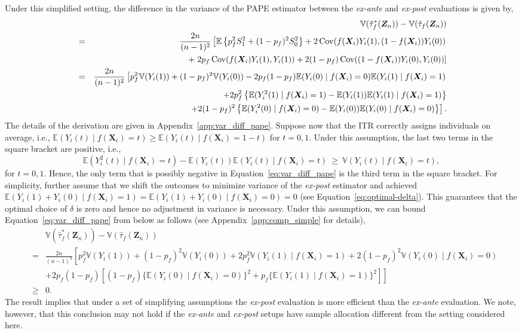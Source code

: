 \documentclass[USenglish,onecolumn]{article}
\DeclareMathOperator\Cov{Cov}
\renewcommand\r{\right}
\renewcommand\l{\left}
\newcommand\E{\mathbb{E}}
\newcommand\V{\mathbb{V}}
\newcommand\bX{\bm{X}}
\newcommand\bZ{\bm{Z}}
\begin{document}
Under this simplified setting, the difference in the variance of the
PAPE estimator between the \textit{ex-ante} and \textit{ex-post}
evaluations is given by,
\begin{eqnarray}
	& & \V(\hat{\tau}_f^\ast(\bZ_n))-\V(\hat{\tau}_f(\bZ_n)) \nonumber\\
	& = & \frac{2n}{(n-1)^2}\l[\E\l\{p_f^2S_1^2+(1-p_f)^2S_0^2\r\}
	+2\Cov(f(\bX_i)Y_i(1),(1-f(\bX_i))Y_i(0)) \r. \nonumber\\
	& & + \l. 2 p_f\Cov(f(\bX_i)Y_i(1),Y_i(1)) +
	2(1-p_f)\Cov((1-f(\bX_i))Y_i(0),Y_i(0))\r] \nonumber\\
	& = & \frac{2n}{(n-1)^2}\l[p_f^2\V(Y_i(1))+(1-p_f)^2\V(Y_i(0))
	-2p_f(1-p_f)\E(Y_i(0) \mid f(\bX_i)=0)\E(Y_i(1)\mid f(\bX_i)=1) \r. \nonumber\\
	& & \hspace{.5in} +  2 p_f^2 \l\{\E(Y_i^2(1) \mid f(\bX_i) = 1) -
	\E(Y_i(1))\E(Y_i(1) \mid f(\bX_i) =1)\r\} \nonumber \\
	& & \l. \hspace{.5in} +  2(1-p_f)^2 \l\{\E(Y_i^2(0) \mid f(\bX_i) = 0) -
	\E(Y_i(0))\E(Y_i(0) \mid f(\bX_i) =0)\r\} \r]. \label{eq:var_diff_pape}
\end{eqnarray}
The details of the derivation are given in
Appendix~\ref{app:var_diff_pape}. Suppose now that the ITR correctly
assigns individuals on average, i.e.,
$\E(Y_i(t) \mid f(\bX_i) = t) \ge \E(Y_i(t) \mid f(\bX_i) = 1-t)$ for
$t=0,1$.  Under this assumption, the last two terms in the square
bracket are positive, i.e.,
\begin{equation*}
	\E(Y_i^2(t) \mid f(\bX_i) = t) - \E(Y_i(t))\E(Y_i(t) \mid f(\bX_i) =
	t) \ \ge \ \V(Y_i(t) \mid f(\bX_i) = t),
\end{equation*}
for $t=0,1$.  Hence, the only term that is possibly negative in
Equation~\eqref{eq:var_diff_pape} is the third term in the square
bracket. For simplicity, further assume that we shift the outcomes to minimize
variance of the \textit{ex-post} estimator and achieved
$\E(Y_i(1) + Y_i(0) \mid f(\bX_i)=1)=\E(Y_i(1) + Y_i(0)\mid
f(\bX_i)=0)=0$ (see Equation~\eqref{eq:optimal-delta}).  This
guarantees that the optimal choice of $\delta$ is zero and hence no
adjustment in variance is necessary.  Under this assumption, we can
bound Equation~\eqref{eq:var_diff_pape} from below as follows (see
Appendix~\ref{app:comp_simple} for details),
\begin{eqnarray*}
	& & \V(\hat{\tau}_f^\ast(\bZ_n))-\V(\hat{\tau}_f(\bZ_n))  \\
	& = & \frac{2n}{(n-1)^2}\l[p_f^2\V(Y_i(1))+(1-p_f)^2\V(Y_i(0))
	+2p_f^2\V(Y_i(1) \mid f(\bX_i)=1) + 2(1-p_f)^2\V(Y_i(0) \mid f(\bX_i)=0) \r.\\
	& & \l. +2p_f(1-p_f)\l[(1-p_f)\{\E(Y_i(0)\mid f(\bX_i)=0)\}^2+p_f\{\E(Y_i(1)\mid f(\bX_i)=1)\}^2\r] \r] \\
	& \geq & 0.
\end{eqnarray*}
The result implies that under a set of simplifying assumptions the
\textit{ex-post} evaluation is more efficient than the
\textit{ex-ante} evaluation.  We note, however, that this conclusion
may not hold if the \textit{ex-ante} and \textit{ex-post} setups have
sample allocation different from the setting considered here.
\end{document}
